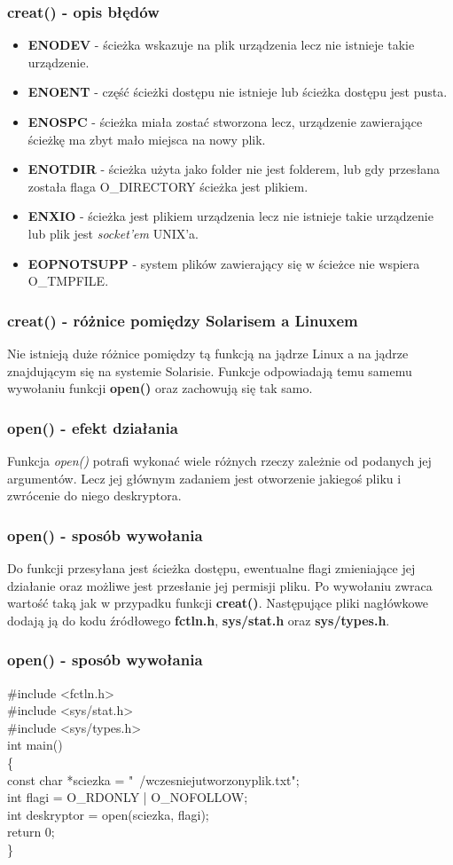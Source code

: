 \documentclass{beamer}
\begin{document}
\begin{frame}
	\frametitle{creat() - opis błędów}
	\begin{itemize}
\item \textbf{ENODEV} - ścieżka wskazuje na plik urządzenia lecz nie istnieje takie urządzenie.
\item \textbf{ENOENT} - część ścieżki dostępu nie istnieje lub ścieżka dostępu jest pusta.
\item \textbf{ENOSPC} - ścieżka miała zostać stworzona lecz, urządzenie zawierające ścieżkę ma zbyt mało miejsca na nowy plik.
\item \textbf{ENOTDIR} - ścieżka użyta jako folder nie jest folderem, lub gdy przesłana została flaga O\_DIRECTORY ścieżka jest plikiem.
\item \textbf{ENXIO} - ścieżka jest plikiem urządzenia lecz nie istnieje takie urządzenie lub plik jest \textit{socket'em} UNIX'a.
\item \textbf{EOPNOTSUPP} - system plików zawierający się w ścieżce nie wspiera O\_TMPFILE.
\end{itemize}
\end{frame}

\begin{frame}
	\frametitle{creat() - różnice pomiędzy Solarisem a Linuxem}
Nie istnieją duże różnice pomiędzy tą funkcją na jądrze Linux a na jądrze znajdującym się na systemie Solarisie.
Funkcje odpowiadają temu samemu wywołaniu funkcji \textbf{open()} oraz zachowują się tak samo.
\end{frame}

\begin{frame}
	\frametitle{open() - efekt działania}
Funkcja \textit{open()} potrafi wykonać wiele różnych rzeczy zależnie od podanych jej argumentów.
Lecz jej głównym zadaniem jest otworzenie jakiegoś pliku i zwrócenie do niego deskryptora.
\end{frame}

\begin{frame}
	\frametitle{open() - sposób wywołania}
Do funkcji przesyłana jest ścieżka dostępu, ewentualne flagi zmieniające jej działanie oraz możliwe jest przesłanie jej permisji pliku.
Po wywołaniu zwraca wartość taką jak w przypadku funkcji \textbf{creat()}.
Następujące pliki nagłówkowe dodają ją do kodu źródłowego \textbf{fctln.h}, \textbf{sys/stat.h} oraz \textbf{sys/types.h}.
\end{frame}

\begin{frame}
	\frametitle{open() - sposób wywołania}
\#include <fctln.h>\\
\#include <sys/stat.h>\\
\#include <sys/types.h>\\
int main()\\
\{\\
	const char *sciezka = "~/wczesniejutworzonyplik.txt";\\
	int flagi = O\_RDONLY | O\_NOFOLLOW;\\
	int deskryptor = open(sciezka, flagi);\\
	return 0;\\
\}
\end{frame}
\end{document}
